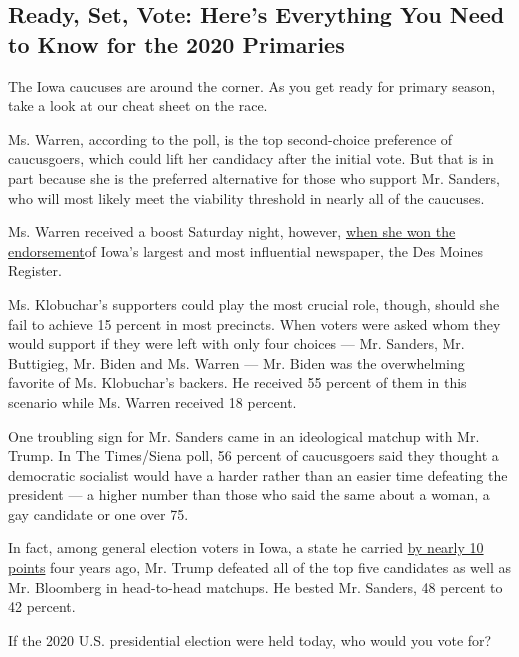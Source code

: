 \hypertarget{ready-set-vote-heres-everything-you-need-to-know-for-the-2020-primaries}{%
\subsection{Ready, Set, Vote: Here's Everything You Need to Know for the
2020
Primaries}\label{ready-set-vote-heres-everything-you-need-to-know-for-the-2020-primaries}}

The Iowa caucuses are around the corner. As you get ready for primary
season, take a look at our cheat sheet on the race.

Ms. Warren, according to the poll, is the top second-choice preference
of caucusgoers, which could lift her candidacy after the initial vote.
But that is in part because she is the preferred alternative for those
who support Mr. Sanders, who will most likely meet the viability
threshold in nearly all of the caucuses.

Ms. Warren received a boost Saturday night, however,
\href{https://www.nytimes3xbfgragh.onion/2020/01/25/us/politics/elizabeth-warren-des-moines-register-endorsement.html?searchResultPosition=1}{when
she won the endorsement}of Iowa's largest and most influential
newspaper, the Des Moines Register.

Ms. Klobuchar's supporters could play the most crucial role, though,
should she fail to achieve 15 percent in most precincts. When voters
were asked whom they would support if they were left with only four
choices --- Mr. Sanders, Mr. Buttigieg, Mr. Biden and Ms. Warren --- Mr.
Biden was the overwhelming favorite of Ms. Klobuchar's backers. He
received 55 percent of them in this scenario while Ms. Warren received
18 percent.

One troubling sign for Mr. Sanders came in an ideological matchup with
Mr. Trump. In The Times/Siena poll, 56 percent of caucusgoers said they
thought a democratic socialist would have a harder rather than an easier
time defeating the president --- a higher number than those who said the
same about a woman, a gay candidate or one over 75.

In fact, among general election voters in Iowa, a state he carried
\href{https://www.nytimes3xbfgragh.onion/elections/2016/results/iowa-president-clinton-trump}{by
nearly 10 points} four years ago, Mr. Trump defeated all of the top five
candidates as well as Mr. Bloomberg in head-to-head matchups. He bested
Mr. Sanders, 48 percent to 42 percent.

If the 2020 U.S. presidential election were held today, who would you
vote for?

